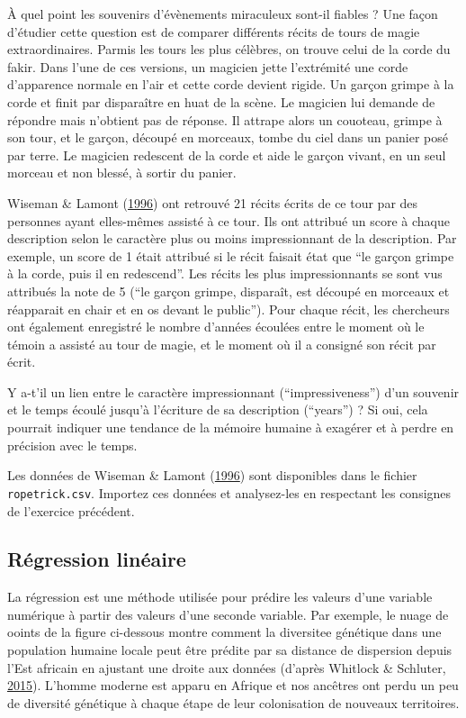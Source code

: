 \documentclass[a4paperpaper,]{article}
\begin{document}
À quel point les souvenirs d'évènements miraculeux sont-il fiables ? Une façon d'étudier cette question est de comparer différents récits de tours de magie extraordinaires. Parmis les tours les plus célèbres, on trouve celui de la corde du fakir. Dans l'une de ces versions, un magicien jette l'extrémité une corde d'apparence normale en l'air et cette corde devient rigide. Un garçon grimpe à la corde et finit par disparaître en huat de la scène. Le magicien lui demande de répondre mais n'obtient pas de réponse. Il attrape alors un couoteau, grimpe à son tour, et le garçon, découpé en morceaux, tombe du ciel dans un panier posé par terre. Le magicien redescent de la corde et aide le garçon vivant, en un seul morceau et non blessé, à sortir du panier.

Wiseman \& Lamont (\protect\hyperlink{ref-wiseman1996}{1996}) ont retrouvé 21 récits écrits de ce tour par des personnes ayant elles-mêmes assisté à ce tour. Ils ont attribué un score à chaque description selon le caractère plus ou moins impressionnant de la description. Par exemple, un score de 1 était attribué si le récit faisait état que ``le garçon grimpe à la corde, puis il en redescend''. Les récits les plus impressionnants se sont vus attribués la note de 5 (``le garçon grimpe, disparaît, est découpé en morceaux et réapparait en chair et en os devant le public'').
Pour chaque récit, les chercheurs ont également enregistré le nombre d'années écoulées entre le moment où le témoin a assisté au tour de magie, et le moment où il a consigné son récit par écrit.

Y a-t'il un lien entre le caractère impressionnant (``impressiveness'') d'un souvenir et le temps écoulé jusqu'à l'écriture de sa description (``years'') ? Si oui, cela pourrait indiquer une tendance de la mémoire humaine à exagérer et à perdre en précision avec le temps.

Les données de Wiseman \& Lamont (\protect\hyperlink{ref-wiseman1996}{1996}) sont disponibles dans le fichier \texttt{ropetrick.csv}. Importez ces données et analysez-les en respectant les consignes de l'exercice précédent.

\hypertarget{regression-lineaire}{%
\subsection{Régression linéaire}\label{regression-lineaire}}

La régression est une méthode utilisée pour prédire les valeurs d'une variable numérique à partir des valeurs d'une seconde variable. Par exemple, le nuage de ooints de la figure ci-dessous montre comment la diversitee génétique dans une population humaine locale peut être prédite par sa distance de dispersion depuis l'Est africain en ajustant une droite aux données (d'après Whitlock \& Schluter, \protect\hyperlink{ref-whitlock2015}{2015}). L'homme moderne est apparu en Afrique et nos ancêtres ont perdu un peu de diversité génétique à chaque étape de leur colonisation de nouveaux territoires.
\end{document}
